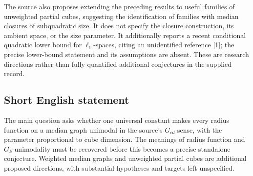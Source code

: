 \documentclass[11pt]{article}
\begin{document}
The source also proposes extending the preceding results to useful families of unweighted partial cubes, suggesting the identification of families with median closures of subquadratic size. It does not specify the closure construction, its ambient space, or the size parameter. It additionally reports a recent conditional quadratic lower bound for \(\ell_1\)-spaces, citing an unidentified reference [1]; the precise lower-bound statement and its assumptions are absent. These are research directions rather than fully quantified additional conjectures in the supplied record.
\subsection{Short English statement}
The main question asks whether one universal constant makes every radius function on a median graph unimodal in the source's \(G_{cd}\) sense, with the parameter proportional to cube dimension. The meanings of radius function and \(G_k\)-unimodality must be recovered before this becomes a precise standalone conjecture. Weighted median graphs and unweighted partial cubes are additional proposed directions, with substantial hypotheses and targets left unspecified.
\end{document}
